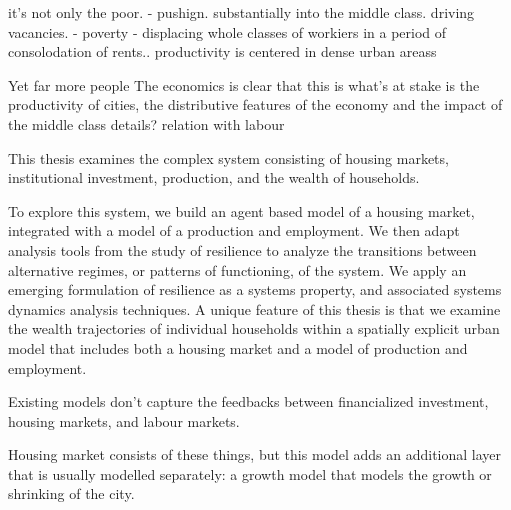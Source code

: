 it's not only the poor. - pushign. substantially into the middle class. driving vacancies.   - poverty
- displacing whole classes of workiers
in a period of consolodation of rents..
productivity is centered in dense urban areass

Yet far more people
The economics is clear that this is what's at stake is the productivity of cities, the distributive features of the economy and the impact of the middle class %
details? relation with labour

This thesis examines the complex system consisting of  housing markets, institutional investment, production, and the wealth of households.

To explore this system, we build an agent based model of a housing market, integrated with a model of a production and employment. We then adapt analysis tools from the study of resilience to analyze the transitions between alternative regimes, or patterns of functioning, of the system. We apply an emerging formulation of resilience as a systems property, and associated systems dynamics analysis techniques. A unique feature of this thesis is that we examine the wealth trajectories of individual households within a spatially explicit urban model that includes both a housing market and a model of production and employment. 



Existing models don't capture the feedbacks between financialized investment, housing markets, and labour markets. 

Housing market consists of these things, but this model adds an additional layer that is usually modelled separately: a growth model that models the growth or shrinking of the city. 

